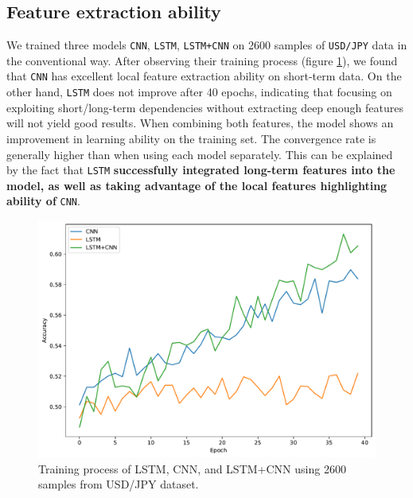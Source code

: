 \documentclass[aps,prb,groupedaddress,twocolumn,showpacs,dvipdfmx,superscriptaddress,pdftex]{revtex4-2}
\begin{document}
\subsection{Feature extraction ability}


We trained three models \verb|CNN|, \verb|LSTM|, \verb|LSTM+CNN| on 2600 samples of \verb|USD/JPY| data in the conventional way. After observing their training process (figure \ref{fig:lstm_cnn}), we found that \verb|CNN| has excellent local feature extraction ability on short-term data. On the other hand, \verb|LSTM| does not improve after 40 epochs, indicating that focusing on exploiting short/long-term dependencies without extracting deep enough features will not yield good results. When combining both features, the model shows an improvement in learning ability on the training set. The convergence rate is generally higher than when using each model separately. This can be explained by the fact that \verb|LSTM| \textbf{successfully integrated long-term features into the model, as well as taking advantage of the local features highlighting ability of} \verb|CNN|.

\begin{figure}
    \centering
    \includegraphics[width=\linewidth]{img/models.pdf}
    \caption{Training process of LSTM, CNN, and LSTM+CNN using 2600 samples from USD/JPY dataset.}
    \label{fig:lstm_cnn}
\end{figure}
\end{document}
